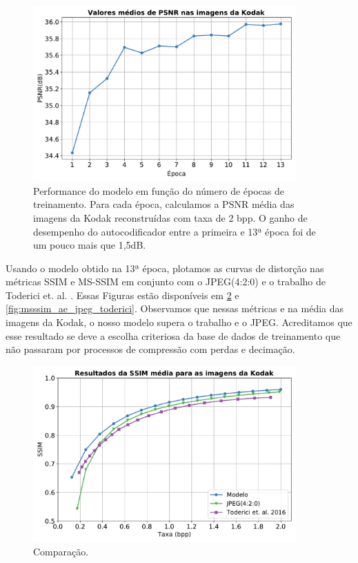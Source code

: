 \begin{figure}
	\centering
	\includegraphics[width=0.9\textwidth]{figuras/psnr_13epochs.pdf}
	\caption[Performance do modelo em função do número de épocas de treinamento]{Performance do modelo em função do número de épocas de treinamento. Para cada época, calculamos a PSNR média das imagens da Kodak reconstruídas com taxa de 2 bpp.  O ganho de desempenho do autocodificador entre a primeira e 13ª época foi de um pouco mais que 1,5dB.}
	\label{fig:psnr_13epocas}
\end{figure}		

Usando o modelo obtido na 13ª época, plotamos as curvas de distorção nas métricas SSIM e MS-SSIM em conjunto com o JPEG(4:2:0) e o trabalho de Toderici et. al. \cite{FullResolution2017Toderici}. Essas Figuras estão disponíveis em \ref{fig:ssim_ae_jpeg_toderici} e   \ref{fig:msssim_ae_jpeg_toderici}. 
Observamos que nessas métricas e na média das imagens da Kodak, o nosso modelo supera o trabalho \cite{FullResolution2017Toderici} e o JPEG. Acreditamos que esse resultado se deve a escolha criteriosa da base de dados de treinamento que não passaram por processos de compressão com perdas e decimação.

\begin{figure}
	\centering
	\includegraphics[width=0.9\textwidth]{figuras/ssim_ae_jpeg_toderici.pdf}
	\caption{Comparação.}
	\label{fig:ssim_ae_jpeg_toderici}
\end{figure}	




